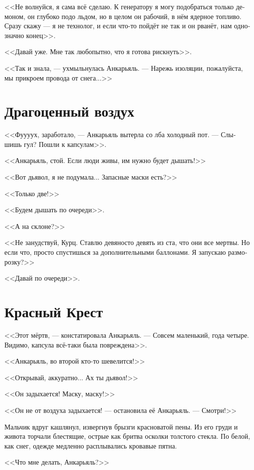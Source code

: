 \documentclass[a4paper,12pt,fleqn]{book}\usepackage{polyglossia}\setdefaultlanguage[babelshorthands=true]{russian}\setotherlanguage{english}\defaultfontfeatures{Ligatures=TeX,Mapping=tex-text}\usepackage{xcolor}\newcommand{\ml}[3]{#2}
\begin{document}
<<Не волнуйся, я сама всё сделаю.
К генератору я могу подобраться только демоном, он глубоко подо льдом, но в целом он рабочий, в нём ядерное топливо.
Сразу скажу --- я не технолог, и если что-то пойдёт не так и он рванёт, нам однозначно конец>>.

<<Давай уже.
Мне так любопытно, что я готова рискнуть>>.

<<Так и знала, --- ухмыльнулась Анкарьяль.
--- Нарежь изоляции, пожалуйста, мы прикроем провода от снега...>>

\section{Драгоценный воздух}

<<Фуууух, заработало, --- Анкарьяль вытерла со лба холодный пот.
--- Слышишь гул?
Пошли к капсулам>>.

<<Анкарьяль, стой.
Если люди живы, им нужно будет дышать!>>

<<Вот дьявол, я не подумала...
Запасные маски есть?>>

<<Только две!>>

<<Будем дышать по очереди>>.

<<А на склоне?>>

<<Не занудствуй, Курц.
Ставлю девяносто девять из ста, что они все мертвы.
Но если что, просто спустишься за дополнительными баллонами.
Я запускаю разморозку?>>

<<Давай по очереди>>.

\section{Красный Крест}

<<Этот мёртв, --- констатировала Анкарьяль.
--- Совсем маленький, года четыре.
Видимо, капсула всё-таки была повреждена>>.

<<Анкарьяль, во второй кто-то шевелится!>>

<<Открывай, аккуратно... Ах ты дьявол!>>

<<Он задыхается!
Маску, маску!>>

<<Он не от воздуха задыхается! --- остановила её Анкарьяль.
--- Смотри!>>

Мальчик вдруг кашлянул, извергнув брызги красноватой пены.
Из его груди и живота торчали блестящие, острые как бритва осколки толстого стекла.
По белой, как снег, одежде медленно расплывались кровавые пятна.

<<Что мне делать, Анкарьяль?>>
\end{document}
